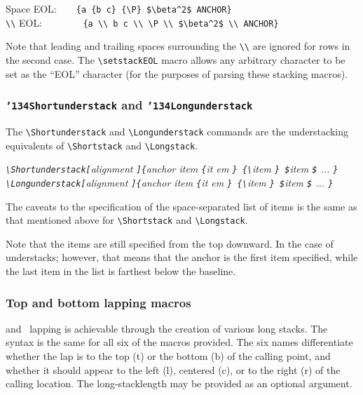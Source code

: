 \documentclass{article}
\let\vb\verb
\newcommand\cmd[1]{\texttt{\char'134#1}}
\begin{document}
Space EOL:~~~~\vb|{a {b c} {\P} $\beta^2$ ANCHOR}|\\
\vb|\\| EOL:~~~~~~~~\,\vb|{a \\ b c \\ \P \\ $\beta^2$ \\ ANCHOR}|

Note that leading and trailing spaces surrounding the \verb|\\| are ignored 
for rows in the second
case.  The \vb|\setstackEOL| macro allows any arbitrary character to be
set as the ``EOL'' character (for the purposes of parsing these
stacking macros).

\subsubsection{\cmd{Shortunderstack} and \cmd{Longunderstack}\label{s:slus}}

The \vb|\Shortunderstack| and \vb|\Longunderstack| commands are the
understacking equivalents of \vb|\Shortstack| and \vb|\Longstack|.

\itshape
\vb|\Shortunderstack[|alignment%
  \vb|]{|anchor item %
  \vb|{|it em%
  \vb|} {\|item%
  \vb|} $|item%
  \vb|$| ...%
  \vb|}|\\
\vb|\Longunderstack[|alignment%
  \vb|]{|anchor item %
  \vb|{|it em%
  \vb|} {\|item%
  \vb|} $|item%
  \vb|$| ...%
  \vb|}|
\upshape

The caveats to the specification of the space-separated list of items is
the same as that mentioned above for \vb|\Shortstack| and
\vb|\Longstack|.

Note that the items are still specified from the top downward.
In the case of understacks; however, that means that the anchor is the
first item specified, while the last item in the list is farthest below
the baseline.

\subsubsection{Top and bottom lapping macros\label{s:lapdef}}

and ~lapping is achievable through the creation of various
long stacks.  The syntax is the same for all six of the macros provided.
The six names differentiate whether the lap is to the top (t) or the
bottom (b) of the calling point, and whether it should appear to the
left (l), centered (c), or to the right (r) of the calling location.
The long-stacklength may be provided as an optional argument.
\end{document}
